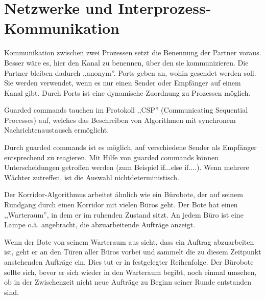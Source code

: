 \section{Netzwerke und Interprozess-Kommunikation}

\begin{answer}
Kommunikation zwischen zwei Prozessen setzt die Benennung der Partner voraus. Besser wäre es, hier den Kanal zu benennen, über den sie kommunizieren. Die Partner bleiben dadurch ,,anonym''. Ports geben an, wohin gesendet werden soll. Sie werden verwendet, wenn es nur einen Sender oder Empfänger auf einem Kanal gibt. Durch Ports ist eine dynamische Zuordnung zu Prozessen möglich.
\end{answer}

\begin{answer}
Guarded commands tauchen im Protokoll ,,CSP'' (Communicating Sequential Processes) auf, welches das Beschreiben von Algorithmen mit synchronem Nachrichtenaustausch ermöglicht.

Durch guarded commands ist es möglich, auf verschiedene Sender als Empfänger entsprechend
zu reagieren. Mit Hilfe von guarded commands können Unterscheidungen getroffen werden (zum Beispiel
if...else if....).
Wenn mehrere Wächter zutreffen, ist die Auswahl nichtdeterministisch.
\end{answer}

\begin{answer}
Der Korridor-Algorithmus arbeitet ähnlich wie ein Bürobote, der auf seinem Rundgang durch einen Korridor mit vielen Büros geht. Der Bote hat einen ,,Warteraum'', in dem er im ruhenden Zustand sitzt. An jedem Büro ist eine Lampe o.ä. angebracht, die abzuarbeitende Aufträge anzeigt.

Wenn der Bote von seinem Warteraum aus sieht, dass ein Auftrag abzuarbeiten ist, geht er an den Türen aller Büros vorbei und sammelt die zu diesem Zeitpunkt anstehenden Aufträge ein. Dies tut er in festgelegter Reihenfolge. Der Bürobote sollte sich, bevor er sich wieder in den Warteraum begibt, noch einmal umsehen, ob in der Zwischenzeit nicht neue Aufträge zu Beginn seiner Runde entstanden sind.
\end{answer}

